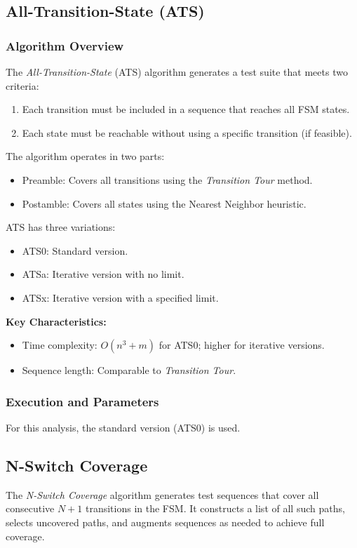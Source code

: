 \documentclass[main.tex]{subfiles}
\begin{document}
\subsection{All-Transition-State (ATS)}
\subsubsection{Algorithm Overview}
The \textit{All-Transition-State} (ATS) algorithm generates a test suite that meets two criteria:
\begin{enumerate}
    \item Each transition must be included in a sequence that reaches all FSM states.
    \item Each state must be reachable without using a specific transition (if feasible).
\end{enumerate}

The algorithm operates in two parts:
\begin{itemize}
    \item Preamble: Covers all transitions using the \textit{Transition Tour} method.
    \item Postamble: Covers all states using the Nearest Neighbor heuristic.
\end{itemize}

ATS has three variations:
\begin{itemize}
    \item ATS0: Standard version.
    \item ATSa: Iterative version with no limit.
    \item ATSx: Iterative version with a specified limit.
\end{itemize}

\textbf{Key Characteristics:}
\begin{itemize}
    \item Time complexity: $O(n^3 + m)$ for ATS0; higher for iterative versions.
    \item Sequence length: Comparable to \textit{Transition Tour}.
\end{itemize}

\subsubsection{Execution and Parameters}
For this analysis, the standard version (ATS0) is used.

\subsection{N-Switch Coverage}
The \textit{N-Switch Coverage} algorithm generates test sequences that cover all consecutive $N+1$ transitions in the FSM. It constructs a list of all such paths, selects uncovered paths, and augments sequences as needed to achieve full coverage.
\end{document}
